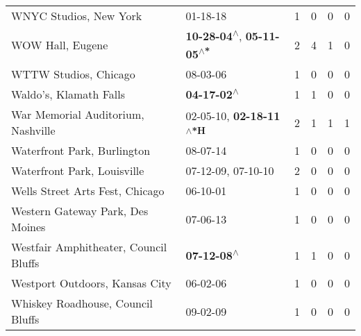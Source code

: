 \begin{supertabular}{p{0.4\textwidth}p{0.3\textwidth}p{0.05\textwidth}p{0.05\textwidth}p{0.05\textwidth}p{0.05\textwidth}}
                                                       WNYC Studios, New York &                                                                  01-18-18\textsuperscript{} &  1 &  0 &  0 &  0 \\
                                                             WOW Hall, Eugene &   \textbf{10-28-04\textsuperscript{$\wedge$}}, \textbf{05-11-05\textsuperscript{$\wedge$*}} &  2 &  4 &  1 &  0 \\
                                                        WTTW Studios, Chicago &                                                                  08-03-06\textsuperscript{} &  1 &  0 &  0 &  0 \\
                                                       Waldo's, Klamath Falls &                                                 \textbf{04-17-02\textsuperscript{$\wedge$}} &  1 &  1 &  0 &  0 \\
                                           War Memorial Auditorium, Nashville &                   02-05-10\textsuperscript{}, \textbf{02-18-11\textsuperscript{$\wedge$*H}} &  2 &  1 &  1 &  1 \\
                                                  Waterfront Park, Burlington &                                                                  08-07-14\textsuperscript{} &  1 &  0 &  0 &  0 \\
                                                  Waterfront Park, Louisville &                                      07-12-09\textsuperscript{}, 07-10-10\textsuperscript{} &  2 &  0 &  0 &  0 \\
                                              Wells Street Arts Fest, Chicago &                                                                  06-10-01\textsuperscript{} &  1 &  0 &  0 &  0 \\
                                             Western Gateway Park, Des Moines &                                                                  07-06-13\textsuperscript{} &  1 &  0 &  0 &  0 \\
                                        Westfair Amphitheater, Council Bluffs &                                                 \textbf{07-12-08\textsuperscript{$\wedge$}} &  1 &  1 &  0 &  0 \\
                                               Westport Outdoors, Kansas City &                                                                  06-02-06\textsuperscript{} &  1 &  0 &  0 &  0 \\
                                            Whiskey Roadhouse, Council Bluffs &                                                                  09-02-09\textsuperscript{} &  1 &  0 &  0 &  0 \\

\end{supertabular}
